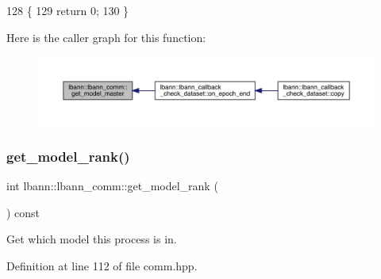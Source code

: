 \begin{DoxyCode}
128                                       \{
129     \textcolor{keywordflow}{return} 0;
130   \}
\end{DoxyCode}
Here is the caller graph for this function\+:\nopagebreak
\begin{figure}[H]
\begin{center}
\leavevmode
\includegraphics[width=350pt]{classlbann_1_1lbann__comm_a96d8d7a0ff8ee1511f8c8b8fa92628af_icgraph}
\end{center}
\end{figure}
\mbox{\label{classlbann_1_1lbann__comm_a6422f70c92bed0b78179facc52b066f7}} 
\subsubsection{\texorpdfstring{get\+\_\+model\+\_\+rank()}{get\_model\_rank()}}
{\footnotesize\ttfamily int lbann\+::lbann\+\_\+comm\+::get\+\_\+model\+\_\+rank (\begin{DoxyParamCaption}{ }\end{DoxyParamCaption}) const\hspace{0.3cm}{\ttfamily [inline]}}

Get which model this process is in. 

Definition at line 112 of file comm.\+hpp.


